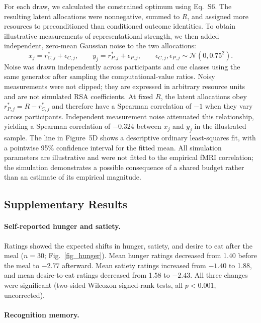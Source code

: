 \documentclass[12pt,letterpaper]{article}
\begin{document}
For each draw, we calculated the constrained optimum using Eq.~S6. The resulting latent allocations were nonnegative, summed to $R$, and assigned more resources to preconditioned than conditioned outcome identities. To obtain illustrative measurements of representational strength, we then added independent, zero-mean Gaussian noise to the two allocations:
\begin{equation}
x_j=r_{C,j}^*+\epsilon_{C,j},\qquad y_j=r_{P,j}^*+\epsilon_{P,j},\qquad
\epsilon_{C,j},\epsilon_{P,j}\sim\mathcal{N}(0,0.75^2).
\tag{S8}
\end{equation}
Noise was drawn independently across participants and cue classes using the same generator after sampling the computational-value ratios. Noisy measurements were not clipped; they are expressed in arbitrary resource units and are not simulated RSA coefficients. At fixed $R$, the latent allocations obey $r_{P,j}^*=R-r_{C,j}^*$ and therefore have a Spearman correlation of $-1$ when they vary across participants. Independent measurement noise attenuated this relationship, yielding a Spearman correlation of $-0.324$ between $x_j$ and $y_j$ in the illustrated sample. The line in Figure~5D shows a descriptive ordinary least-squares fit, with a pointwise 95\% confidence interval for the fitted mean. All simulation parameters are illustrative and were not fitted to the empirical fMRI correlation; the simulation demonstrates a possible consequence of a shared budget rather than an estimate of its empirical magnitude.

\subsection*{Supplementary Results}

\paragraph*{Self-reported hunger and satiety.}

Ratings showed the expected shifts in hunger, satiety, and desire to eat after the meal ($n = 30$; Fig.~\ref{fig_hunger}). Mean hunger ratings decreased from 1.40 before the meal to $-2.77$ afterward. Mean satiety ratings increased from $-1.40$ to 1.88, and mean desire-to-eat ratings decreased from 1.58 to $-2.43$. All three changes were significant (two-sided Wilcoxon signed-rank tests, all $p < 0.001$, uncorrected).

\paragraph*{Recognition memory.}
\end{document}
